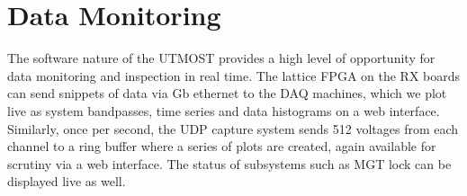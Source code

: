 \section{Data Monitoring }

The software nature of the UTMOST provides a high level of opportunity for data monitoring and inspection in real time. The lattice FPGA on the RX boards can send snippets of data via Gb ethernet to the DAQ machines, which we plot live as system bandpasses, time series and data histograms on a web interface. Similarly, once per second, the UDP capture system sends 512 voltages from each channel to a ring buffer where a series of plots are created, again available for scrutiny via a web interface. The status of subsystems such as MGT lock can be displayed live as well.

  